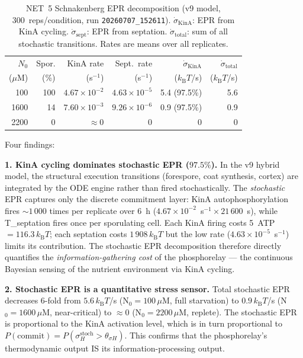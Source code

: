 \documentclass[11pt,a4paper]{article}
\newcommand{\kB}{k_{\mathrm{B}}}
\begin{document}
\begin{table}[h]
\centering
\caption{NET~5 Schnakenberg EPR decomposition (v9 model, 300~reps/condition,
  run \texttt{20260707\_152611}).
  $\dot\sigma_{\mathrm{KinA}}$: EPR from KinA cycling.
  $\dot\sigma_{\mathrm{sept}}$: EPR from septation.
  $\dot\sigma_{\mathrm{total}}$: sum of all stochastic transitions.
  Rates are means over all replicates.}
\label{tab:t5}
{\small\begin{tabular}{rrrrrr}
\toprule
$N_0$ & Spor. & KinA rate & Sept.\ rate & $\dot\sigma_{\mathrm{KinA}}$ & $\dot\sigma_{\mathrm{total}}$ \\
($\mu$M) & (\%) & (s$^{-1}$) & (s$^{-1}$) & ($\kB T$/s) & ($\kB T$/s) \\
\midrule
100  & 100 & $4.67\times10^{-2}$ & $4.63\times10^{-5}$ & 5.4 (97.5\%) & 5.6 \\
1600 &  14 & $7.60\times10^{-3}$ & $9.26\times10^{-6}$ & 0.9 (97.5\%) & 0.9 \\
2200 &   0 & $\approx 0$         & $0$                  & 0 & 0 \\
\bottomrule
\end{tabular}}
\end{table}

Four findings:

\textbf{1. KinA cycling dominates stochastic EPR ($97.5\%$).}
In the v9 hybrid model, the structural execution transitions (forespore,
coat synthesis, cortex) are integrated by the ODE engine rather than
fired stochastically.  The \emph{stochastic} EPR captures only the
discrete commitment layer: KinA autophosphorylation fires
$\sim 1\,000$ times per replicate over 6~h ($4.67 \times 10^{-2}$~s$^{-1}
\times 21\,600$~s), while T\_septation fires once per sporulating cell.
Each KinA firing costs 5~ATP~$= 116.3\,\kB T$; each septation costs
$1\,908\,\kB T$ but the low rate ($4.63\times10^{-5}$~s$^{-1}$) limits
its contribution.
The stochastic EPR decomposition therefore directly quantifies the
\emph{information-gathering cost} of the phosphorelay --- the continuous
Bayesian sensing of the nutrient environment via KinA cycling.

\textbf{2. Stochastic EPR is a quantitative stress sensor.}
Total stochastic EPR decreases 6-fold from $5.6\,\kB T$/s (N$_0 = 100\,\mu$M,
full starvation) to $0.9\,\kB T$/s (N$_0 = 1600\,\mu$M, near-critical) to
$\approx 0$ (N$_0 = 2200\,\mu$M, replete).  The stochastic EPR is
proportional to the KinA activation level, which is in turn proportional
to $P(\text{commit}) = P(\sigma_H^{\mathrm{stoch}} > \theta_{\sigma H})$.
This confirms that the phosphorelay's thermodynamic output IS its
information-processing output.
\end{document}
